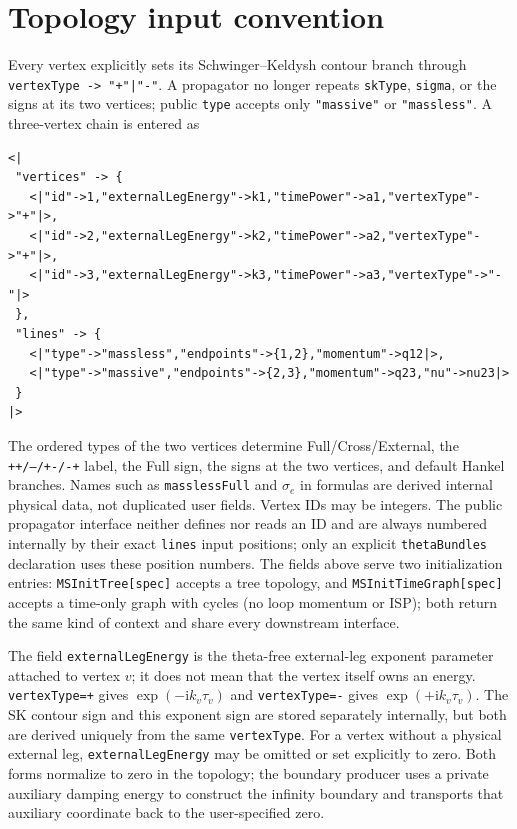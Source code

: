 \documentclass[11pt,a4paper]{article}
\newcommand{\ii}{\mathrm i}
\begin{document}
\tableofcontents

\section{Topology input convention}
\label{sec:topology-input}

Every vertex explicitly sets its Schwinger--Keldysh contour branch through
\texttt{vertexType -> "+"|"-"}. A propagator no longer repeats \texttt{skType},
\texttt{sigma}, or the signs at its two vertices; public \texttt{type} accepts only \texttt{"massive"}
or \texttt{"massless"}. A three-vertex chain is entered as
\begin{verbatim}
<|
 "vertices" -> {
   <|"id"->1,"externalLegEnergy"->k1,"timePower"->a1,"vertexType"->"+"|>,
   <|"id"->2,"externalLegEnergy"->k2,"timePower"->a2,"vertexType"->"+"|>,
   <|"id"->3,"externalLegEnergy"->k3,"timePower"->a3,"vertexType"->"-"|>
 },
 "lines" -> {
   <|"type"->"massless","endpoints"->{1,2},"momentum"->q12|>,
   <|"type"->"massive","endpoints"->{2,3},"momentum"->q23,"nu"->nu23|>
 }
|>
\end{verbatim}
The ordered types of the two vertices determine Full/Cross/External, the
\texttt{++/--/+-/-+} label, the Full sign, the signs at the two vertices, and default Hankel branches.
Names such as \texttt{masslessFull} and $\sigma_e$ in formulas are derived internal physical
data, not duplicated user fields. Vertex IDs may be integers. The public propagator interface neither defines nor reads an ID and
are always numbered internally by their exact \texttt{lines} input positions; only an explicit
\texttt{thetaBundles} declaration uses these position numbers. The fields above serve two
initialization entries: \texttt{MSInitTree[spec]} accepts a tree topology, and
\texttt{MSInitTimeGraph[spec]} accepts a time-only graph with cycles (no loop momentum or ISP);
both return the same kind of context and share every downstream interface.

The field \texttt{externalLegEnergy} is the theta-free external-leg exponent parameter
attached to vertex $v$; it does not mean that the vertex itself owns an energy.
\texttt{vertexType=+} gives $\exp(-\ii k_v\tau_v)$ and \texttt{vertexType=-} gives
$\exp(+\ii k_v\tau_v)$. The SK contour sign and this exponent sign are stored separately
internally, but both are derived uniquely from the same \texttt{vertexType}.
For a vertex without a physical external leg, \texttt{externalLegEnergy} may be omitted or
set explicitly to zero.  Both forms normalize to zero in the topology; the boundary producer
uses a private auxiliary damping energy to construct the infinity boundary and transports that
auxiliary coordinate back to the user-specified zero.
\end{document}
